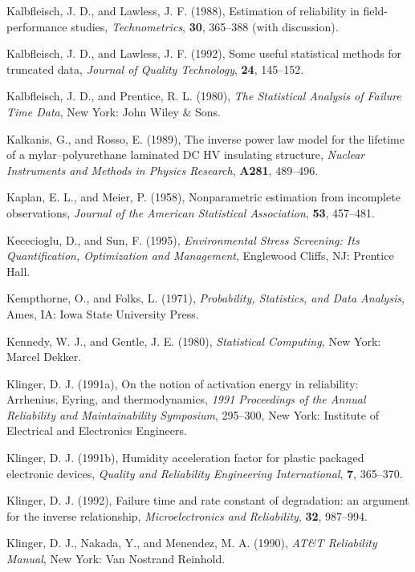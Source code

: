 \begin{thebibliography}{999}
Kalbfleisch, J. D., and Lawless, J. F.  (1988),
Estimation of reliability in field-performance studies,
{\em Technometrics}, {\bf 30}, 365--388 (with discussion).

Kalbfleisch, J. D., and Lawless, J. F. (1992), Some useful statistical
methods for truncated data, {\em Journal of Quality Technology}, {\bf
24}, 145--152.

Kalbfleisch, J. D., and Prentice, R. L. (1980), {\em The Statistical
Analysis of Failure Time Data}, New York: John Wiley \& Sons.

Kalkanis, G., and Rosso, E. (1989),
The inverse power law model for the lifetime of a mylar--polyurethane
laminated DC HV insulating structure, {\em Nuclear Instruments and
Methods in Physics Research}, {\bf A281}, 489--496.

Kaplan, E. L., and Meier, P. (1958), Nonparametric estimation from
incomplete observations, {\em Journal of the American Statistical
Association}, {\bf 53}, 457--481.

Kececioglu, D., and Sun, F. (1995), {\em Environmental Stress Screening: Its
Quantification, Optimization and Management}, Englewood Cliffs, NJ:
 Prentice Hall.

Kempthorne, O., and Folks, L. (1971), {\em Probability, Statistics, and
Data Analysis}, Ames, IA: Iowa State University Press.

Kennedy, W. J., and Gentle, J. E. (1980), {\em Statistical Computing, } New
York: Marcel Dekker.

Klinger, D. J. (1991a), On the notion of activation energy in
reliability: Arrhenius, Eyring, and thermodynamics,  {\em 1991
Proceedings of the Annual Reliability and Maintainability
Symposium}, 295--300, New York: Institute of
Electrical and Electronics Engineers.

Klinger, D. J. (1991b), Humidity acceleration factor for plastic
packaged electronic devices, {\em Quality and Reliability
Engineering International}, {\bf 7}, 365--370.

Klinger, D. J. (1992), Failure time and rate constant of degradation:
an argument for the inverse relationship, {\em Microelectronics and
Reliability}, {\bf 32}, 987--994.

Klinger, D. J., Nakada, Y., and Menendez, M. A. (1990),
{\em AT\&T Reliability Manual}, New York: Van Nostrand Reinhold.


\end{thebibliography}
